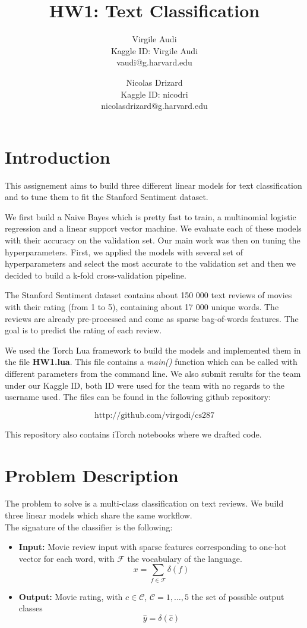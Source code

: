 \documentclass[11pt]{article}
\title{HW1: Text Classification}
\author{Virgile Audi \\ Kaggle ID: Virgile Audi \\ vaudi@g.harvard.edu \and Nicolas Drizard \\ Kaggle ID: nicodri \\ nicolasdrizard@g.harvard.edu }
\begin{document}
\maketitle{}
\section{Introduction}

This assignement aims to build three different linear models for text classification and to tune them to fit the Stanford Sentiment dataset\citep{socher2013recursive}.

We first build a Naive Bayes which is pretty fast to train, a multinomial logistic regression and a linear support vector machine. We evaluate each of these models with their accuracy on the validation set. Our main work was then on tuning the hyperparameters. First, we applied the models with several set of hyperparameters and select the most accurate to the validation set and then we decided to build a k-fold cross-validation pipeline.

The Stanford Sentiment dataset contains about 150 000 text reviews of movies with their rating (from 1 to 5), containing about 17 000 unique words. The reviews are already pre-processed and come as sparse bag-of-words features. The goal is to predict the rating of each review.

We used the Torch Lua framework to build the models and implemented them in the file \textbf{HW1.lua}. This file contains a \textit{main()} function which can be called with different parameters from the command line. We also submit results for the team under our Kaggle ID, both ID were used for the team with no regards to the username used. The files can be found in the following github repository:

$$\text{http://github.com/virgodi/cs287}$$

This repository also contains iTorch notebooks where we drafted code.


\section{Problem Description}

The problem to solve is a multi-class classification on text reviews. We build three linear models which share the same workflow.\\

\noindent The signature of the classifier is the following:

\begin{itemize}
	\item \textbf{Input:} Movie review input with sparse features corresponding to one-hot vector for each word, with $\mathcal{F}$ the vocabulary of the language.
	\[ x = \sum_{f \in \mathcal{F}} \delta(f) \]
	\item \textbf{Output:} Movie rating, with $c \in \mathcal{C}$, $\mathcal{C} = {1, \hdots, 5}$ the set of possible output classes
	\[ \hat{y} = \delta(\hat{c})\]
\end{itemize}
\end{document}
